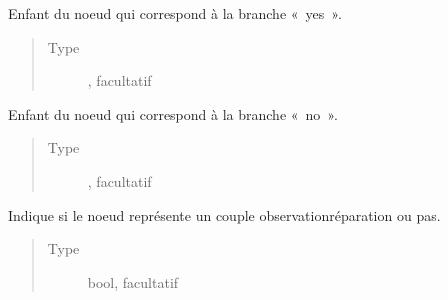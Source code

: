\documentclass[letterpaper,10pt,french]{sphinxmanual}
\begin{document}
\begin{fulllineitems}
\begin{fulllineitems}
\end{fulllineitems}


\begin{fulllineitems}
\label{\detokenize{index:StrategyTree.Observation._yes_child}}
Enfant du noeud qui correspond à la branche « yes ».
\begin{quote}\begin{description}
\item[{Type}] \leavevmode
{\hyperref[\detokenize{index:StrategyTree.NodeST}]{}}, facultatif

\end{description}\end{quote}

\end{fulllineitems}


\begin{fulllineitems}
\label{\detokenize{index:StrategyTree.Observation._no_child}}
Enfant du noeud qui correspond à la branche « no ».
\begin{quote}\begin{description}
\item[{Type}] \leavevmode
{\hyperref[\detokenize{index:StrategyTree.NodeST}]{}}, facultatif

\end{description}\end{quote}

\end{fulllineitems}


\begin{fulllineitems}
\label{\detokenize{index:StrategyTree.Observation._obs_rep_couples}}
Indique si le noeud représente un couple observation\sphinxhyphen{}réparation ou pas.
\begin{quote}\begin{description}
\item[{Type}] \leavevmode
bool, facultatif


\end{description}
\end{quote}
\end{fulllineitems}
\end{fulllineitems}
\end{document}

